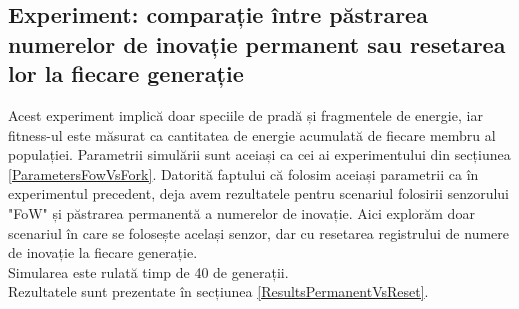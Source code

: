 \subsection{Experiment: comparație între păstrarea numerelor de inovație permanent sau resetarea lor la fiecare generație}\label{ParametersPermanentVsReset}
Acest experiment implică doar speciile de pradă și fragmentele de energie, iar fitness-ul este măsurat ca cantitatea de energie acumulată de fiecare membru al populației.
Parametrii simulării sunt aceiași ca cei ai experimentului din secțiunea \ref{ParametersFowVsFork}.
Datorită faptului că folosim aceiași parametrii ca în experimentul precedent, deja avem rezultatele pentru scenariul folosirii senzorului "FoW" și păstrarea permanentă a numerelor de inovație.
Aici explorăm doar scenariul în care se folosește același senzor, dar cu resetarea registrului de numere de inovație la fiecare generație.\\
Simularea este rulată timp de 40 de generații.\\
Rezultatele sunt prezentate în secțiunea \ref{ResultsPermanentVsReset}.

